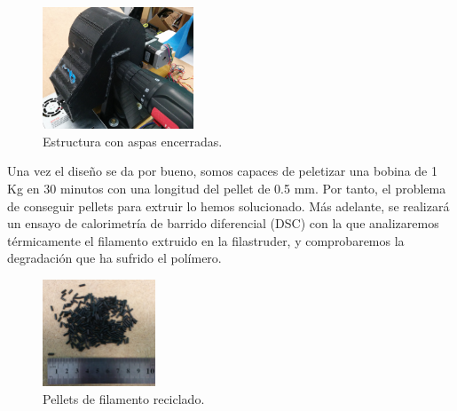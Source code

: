 \begin{figure}[H]
    \centering
    \includegraphics[width=0.4\textwidth]{images/peletizadora/IMG_20150818_172917.jpg}
    \caption{Estructura con aspas encerradas.}
    \label{fig:peletizadora_mecanismo2}
\end{figure}

Una vez el diseño se da por bueno, somos capaces de peletizar una bobina de 1 Kg en 30 minutos con una longitud del pellet de 0.5 mm. Por tanto, el problema de conseguir pellets para extruir lo hemos solucionado. Más adelante, se realizará un ensayo de calorimetría de barrido diferencial (DSC) con la que analizaremos térmicamente el filamento extruido en la filastruder, y comprobaremos la degradación que ha sufrido el polímero.
    
\begin{figure}[H]
    \centering
    \includegraphics[width=0.3\textwidth]{images/peletizadora/IMG_20150819_112740.jpg}
    \caption{Pellets de filamento reciclado.}
    \label{fig:peletizadora_pellets_reciclados}
\end{figure}